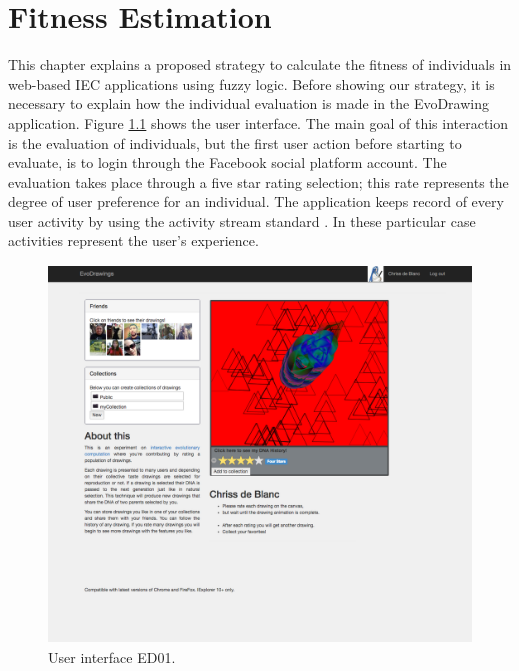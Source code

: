 \chapter{Fitness Estimation}

This chapter explains a proposed strategy to calculate the fitness of
individuals in web-based IEC applications using fuzzy logic. Before showing our
strategy, it is necessary to explain how the individual evaluation is made in
the EvoDrawing application. Figure \ref{fig:UI_ED} shows the user interface. The
main goal of this interaction is the evaluation of individuals, but the first
user action before starting to evaluate, is to login through the Facebook social
platform account. The evaluation takes place through a five star rating
selection; this rate represents the degree of user preference for an individual.
The application keeps record of every user activity by using the activity stream
standard \cite{snell2014json}. In these particular case activities represent the
user's experience.

\begin{figure}
\captionsetup{justification=centering,margin=2cm}
\centering
\setlength\fboxsep{0pt}
\setlength\fboxrule{0.7pt}
\includegraphics[width=12cm,height=10cm,keepaspectratio]{img/UI_ed01.png}
\caption{User interface ED01.}
\label{fig:UI_ED}
\end{figure}

